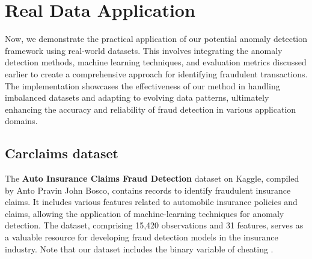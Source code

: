 \documentclass[12pt]{article}
\begin{document}
\section{Real Data Application}\label{SC:RESULT}
Now, we demonstrate the practical application of our potential
anomaly detection framework using real-world datasets. This
involves integrating the anomaly detection methods, machine
learning techniques, and evaluation metrics discussed earlier to
create a comprehensive approach for identifying fraudulent
transactions. The implementation showcases the effectiveness of
our method in handling imbalanced datasets and adapting to
evolving data patterns, ultimately enhancing the accuracy and
reliability of fraud detection in various application domains.

\subsection*{Carclaims dataset}
The \textbf{\small Auto Insurance Claims Fraud Detection} dataset
on Kaggle, compiled by Anto Pravin John Bosco, contains records to
identify fraudulent insurance claims. It includes various features
related to automobile insurance policies and claims, allowing the
application of machine-learning techniques for anomaly detection.
The dataset, comprising 15,420 observations and 31 features,
serves as a valuable resource for developing fraud detection
models in the insurance industry. Note that our dataset includes
the binary variable of cheating \cite{dataset}.
\end{document}
